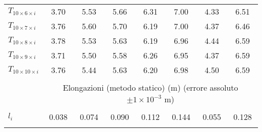 \begin{table*}[p]
\begin{tabular}{l*{7}{c}}
        $T_{10\times6 \times i}$ & 3.70     & 5.53     & 5.66     & 6.31     & 7.00     & 4.33     & 6.51                                       \\[+0.5ex]
        $T_{10\times7 \times i}$ & 3.76     & 5.60     & 5.70     & 6.19     & 7.00     & 4.37     & 6.46                                       \\[+0.5ex]
        $T_{10\times8 \times i}$ & 3.78     & 5.53     & 5.63     & 6.19     & 6.96     & 4.44     & 6.59                                       \\[+0.5ex]
        $T_{10\times9 \times i}$ & 3.71     & 5.50     & 5.58     & 6.26     & 6.95     & 4.37     & 6.59                                       \\[+0.5ex]
        $T_{10\times10\times i}$ & 3.76     & 5.44     & 5.63     & 6.20     & 6.98     & 4.50     & 6.59                                       \\[+0.5ex] \hline \\[-1.5ex]
                                 & \multicolumn{7}{c}{Elongazioni (metodo statico) (m) (errore assoluto $\pm1\times10^{-3}$ m)}                 \\[+0.5ex] \hline \\[-1.5ex]
        $l_i$                    & 0.038    & 0.074    & 0.090    & 0.112    & 0.144    & 0.055    & 0.128                                      \\[+0.5ex]
        \hline \\[-1.5ex]
    \end{tabular}
\end{table*}
